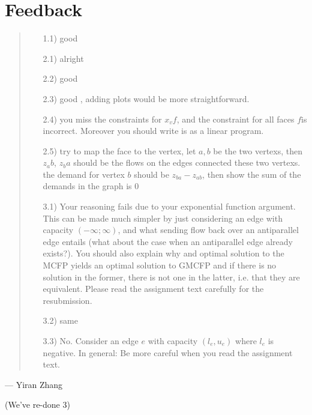 \section{Feedback}
\begin{quotation}%
  \itshape%
  \noindent%
  \begin{itemize}
    \item[1.1)] good  

    \item[2.1)] alright 

    \item[2.2)] good 

    \item[2.3)] good , adding plots would be more straightforward. 

    \item[2.4)]
      you miss the constraints for $x_vf$, and the constraint for all faces $f $is
      incorrect.  Moreover you should write is as a linear program.

    \item[2.5)]
      try to map the face to the vertex, let $a, b$ be the two vertexs, then $z_ab$,
      $z_ba$ should be the flows on the edges connected these two vertexs. the demand
      for vertex $b$ should be $z_{ba}-z_{ab}$, then show the sum of the demands in the graph
      is $0$

    \item[3.1)]
      Your reasoning fails due to your exponential function argument. This can be
      made much simpler by just considering an edge with capacity $(-\infty;\infty)$,
      and what sending flow back over an antiparallel edge entails (what about the
      case when an antiparallel edge already exists?). You should also explain why and
      optimal solution to the MCFP yields an optimal solution to GMCFP and if there is
      no solution in the former, there is not one in the latter, i.e. that they are
      equivalent. Please read the assignment text carefully for the resubmission.

    \item[3.2)] same

    \item[3.3)]
      No. Consider an edge $e$ with capacity $(l_e, u_e)$ where $l_e$ is negative. In
      general: Be more careful when you read the assignment text.
  \end{itemize}

  {\large {}}
\end{quotation}
--- Yiran Zhang

(We've re-done 3)
